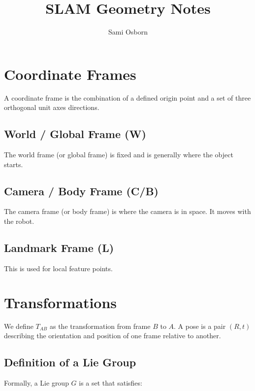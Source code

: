 \documentclass[11pt,a4paper]{article}
\title{SLAM Geometry Notes}
\author{Sami Osborn}
\date{}
\begin{document}
\maketitle

\section{Coordinate Frames}

A coordinate frame is the combination of a defined origin point and a set of three orthogonal unit axes directions.

\subsection*{World / Global Frame (W)}
The world frame (or global frame) is fixed and is generally where the object starts.

\subsection*{Camera / Body Frame (C/B)}
The camera frame (or body frame) is where the camera is in space. It moves with the robot.

\subsection*{Landmark Frame (L)}
This is used for local feature points.

\section{Transformations}

We define \( T_{AB} \) as the transformation from frame \( B \) to \( A \). A pose is a pair \( (R, t) \) describing the orientation and position of one frame relative to another.

\subsection*{Definition of a Lie Group}

Formally, a Lie group \( G \) is a set that satisfies:
\end{document}
